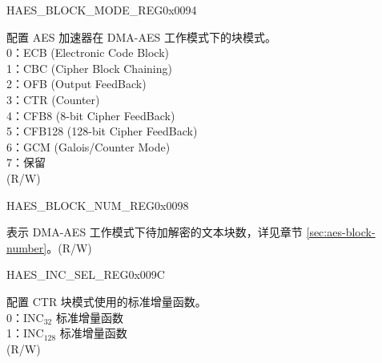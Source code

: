 \begin{register}{H}{AES\_BLOCK\_MODE\_REG}{0x0094}\label{regdesc:AESBLOCKMODEREG}
%
%
\regnewline%
\begin{regdesc}\begin{reglist}
\item [AES\_BLOCK\_MODE] 配置 AES 加速器在 DMA-AES 工作模式下的块模式。\\
0：ECB (Electronic Code Block)\\
1：CBC (Cipher Block Chaining)\\
2：OFB (Output FeedBack)\\
3：CTR (Counter)\\
4：CFB8 (8-bit Cipher FeedBack)\\
5：CFB128 (128-bit Cipher FeedBack)\\
6：GCM (Galois/Counter Mode)\\
7：保留\\
(R/W)
\end{reglist}\end{regdesc}
\end{register}


\begin{register}{H}{AES\_BLOCK\_NUM\_REG}{0x0098}\label{regdesc:AESBLOCKNUMREG}
%
\regnewline%
\begin{regdesc}\begin{reglist}
\item [AES\_BLOCK\_NUM] 表示 DMA-AES 工作模式下待加解密的文本块数，详见章节 \ref{sec:aes-block-number}。(R/W)
\end{reglist}\end{regdesc}
\end{register}


\begin{register}{H}{AES\_INC\_SEL\_REG}{0x009C}\label{regdesc:AESINCSELREG}
%
%
\regnewline%
\begin{regdesc}\begin{reglist}
\item [AES\_INC\_SEL] 配置 CTR 块模式使用的标准增量函数。\\
0：INC$_{32}$ 标准增量函数\\
1：INC$_{128}$ 标准增量函数\\
(R/W)
\end{reglist}\end{regdesc}
\end{register}


